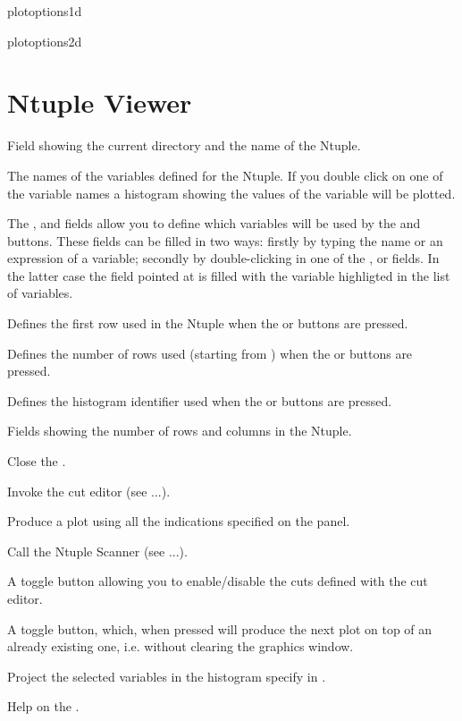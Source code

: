 \begin{PAWf}{plotoptions1d}
\end{PAWf}

\begin{PAWf}{plotoptions2d}
\end{PAWf}

\newpage

\section{Ntuple Viewer}

\newpage

\begin{EnumZW}
\item Field showing the current directory and the name of the Ntuple.
\item The names of the variables defined for the Ntuple.
      If you double click on one of the variable names
      a histogram showing the values of the variable will be plotted.
\item The ,  and  fields allow
      you to define which variables will be used
      by the  and  buttons.
      These fields can be filled in two ways:
      firstly by typing the name or an expression of a variable;
      secondly by double-clicking in one of the ,  or
       fields. In the latter
      case the field pointed at is filled with the variable highligted in
      the list of variables.
\item Defines the first row used in the Ntuple when the 
      or  buttons are pressed.
\item Defines the number of rows used (starting from ) when the
       or  buttons are pressed.
\item Defines the histogram identifier used when the 
      or  buttons are pressed.
\item Fields showing the number of rows and columns in the Ntuple.
\end{EnumZW}

\begin{EnumZB}
\item Close the \NV.
\item Invoke the cut editor (see ...).
\item Produce a plot using all the indications specified on the \NV{} panel.
\item Call the Ntuple Scanner (see ...).
\item A toggle button allowing you to enable/disable the cuts defined with the
      cut editor.
\item A toggle button, which, when pressed will produce the next plot
      on top of an already existing one, i.e. without clearing the graphics
      window.
\item Project the selected variables in the histogram specify in .
\item Help on the \NV.
\end{EnumZB}


